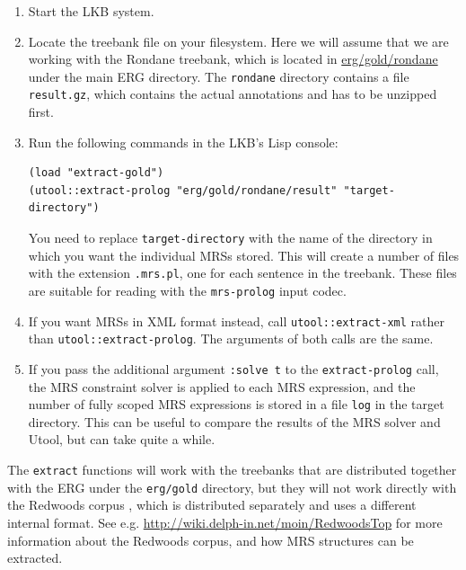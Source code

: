 \begin{enumerate}
\item Start the LKB system.
\item Locate the treebank file on your filesystem. Here we will assume
that we are working with the Rondane treebank, which is located in
\url{erg/gold/rondane} under the main ERG directory. The \verb|rondane| directory contains a file \verb|result.gz|, which contains the actual annotations and has to be unzipped first.
\item Run the following commands in the LKB's Lisp console:
\begin{verbatim}
(load "extract-gold")
(utool::extract-prolog "erg/gold/rondane/result" "target-directory")
\end{verbatim}
You need to replace \verb?target-directory? with the name of the
directory in which you want the individual MRSs stored. This will
create a number of files with the extension \verb?.mrs.pl?, one for
each sentence in the treebank. These files are suitable for reading
with the \verb?mrs-prolog? input codec.
\item If you want MRSs in XML format instead, call
\verb?utool::extract-xml? rather than
\verb?utool::extract-prolog?. The arguments of both calls are the
same. 
\item If you pass the additional argument \verb?:solve t? to the
\verb?extract-prolog? call, the MRS constraint solver is applied to
each MRS expression, and the number of fully scoped MRS expressions is
stored in a file \verb|log| in the target directory. This can be
useful to compare the results of the MRS solver and Utool, but can
take quite a while.
\end{enumerate}

The \verb?extract? functions will work with the treebanks that are
distributed together with the ERG under the \verb|erg/gold| directory,
but they will not work directly with the Redwoods corpus
\cite{Oepen&al:Redwoods}, which is distributed separately and uses a
 different internal format. See e.g.
\url{http://wiki.delph-in.net/moin/RedwoodsTop} for more information
about the Redwoods corpus, and how MRS structures can be extracted.




